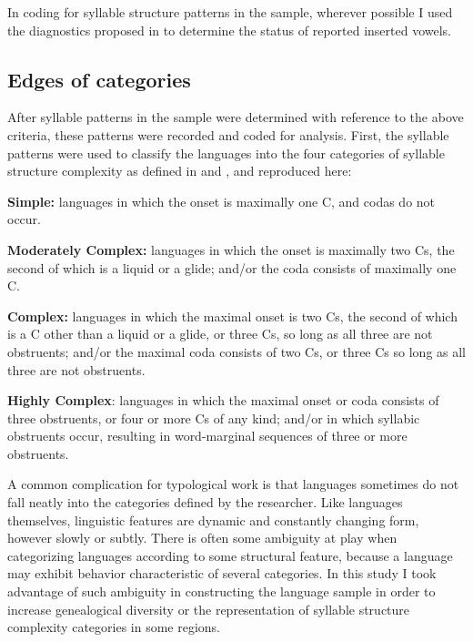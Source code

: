   In coding for syllable structure patterns in the sample, wherever possible I used the diagnostics proposed in \citet{Hall2006} to determine the status of reported inserted vowels.

\subsection{Edges of categories}\label{sec:3.2.3}

  After syllable patterns in the sample were determined with reference to the above criteria, these patterns were recorded and coded for analysis. First, the syllable patterns were used to classify the languages into the four categories of syllable structure complexity as defined in \citet{Maddieson2013a} and , and reproduced here:

\textbf{Simple:} languages in which the onset is maximally one C, and codas do not occur.

\textbf{Moderately Complex:} languages in which the onset is maximally two Cs, the second of which is a liquid or a glide; and/or the coda consists of maximally one C.

\textbf{Complex:} languages in which the maximal onset is two Cs, the second of which is a C other than a liquid or a glide, or three Cs, so long as all three are not obstruents; and/or the maximal coda consists of two Cs, or three Cs so long as all three are not obstruents.

\textbf{Highly Complex}: languages in which the maximal onset or coda consists of three obstruents, or four or more Cs of any kind; and/or in which syllabic obstruents occur, resulting in word-marginal sequences of three or more obstruents.

  A common complication for typological work is that languages sometimes do not fall neatly into the categories defined by the researcher. Like languages themselves, linguistic features are dynamic and constantly changing form, however slowly or subtly. There is often some ambiguity at play when categorizing languages according to some structural feature, because a language may exhibit behavior characteristic of several categories. In this study I took advantage of such ambiguity in constructing the language sample in order to increase genealogical diversity or the representation of syllable structure complexity categories in some regions.

